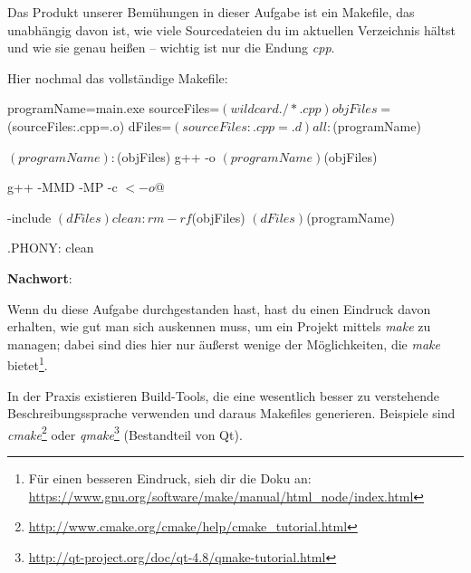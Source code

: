 \documentclass[
  accentcolor=tud1c,	%
  colorbacktitle,		%
  inverttitle,			%
  german,				%
  twoside
]{tudexercise}
\begin{document}
Das Produkt unserer Bemühungen in dieser Aufgabe ist ein Makefile, das unabhängig davon ist, wie viele Sourcedateien du im aktuellen Verzeichnis hältst und wie sie genau heißen -- wichtig ist nur die Endung \emph{cpp}.

Hier nochmal das vollständige Makefile:
\begin{lstmake}
programName=main.exe
sourceFiles=$(wildcard ./*.cpp)
objFiles=$(sourceFiles:.cpp=.o)
dFiles=$(sourceFiles:.cpp=.d)

all: $(programName)

$(programName): $(objFiles)
	g++ -o $(programName) $(objFiles)

	g++ -MMD -MP -c $< -o $@

-include $(dFiles)

clean:
	rm -rf $(objFiles) $(dFiles) $(programName)

.PHONY: clean
\end{lstmake}

\textbf{Nachwort}:

Wenn du diese Aufgabe durchgestanden hast, hast du einen Eindruck davon erhalten, wie gut man sich auskennen muss, um ein Projekt mittels \emph{make} zu managen;
dabei sind dies hier nur äußerst wenige der Möglichkeiten, die \emph{make} bietet\footnote{Für einen besseren Eindruck, sieh dir die Doku an: \url{https://www.gnu.org/software/make/manual/html_node/index.html}}.

In der Praxis existieren Build-Tools, die eine wesentlich besser zu verstehende Beschreibungssprache verwenden und daraus Makefiles generieren.
Beispiele sind \emph{cmake}\footnote{\url{http://www.cmake.org/cmake/help/cmake_tutorial.html}} oder \emph{qmake}\footnote{\url{http://qt-project.org/doc/qt-4.8/qmake-tutorial.html}} (Bestandteil von Qt).
\end{document}
